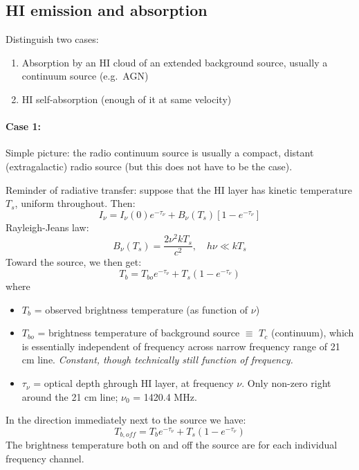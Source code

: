 \documentclass[11pt]{article}
\newcommand{\mar}[1]{\hspace{0pt}\marginpar{-\textcolor{black}{#1}-}}
\newcommand{\mynotes}[1]{{\fontfamily{cmss}\selectfont \textit{#1}}}
\begin{document}
\subsection{HI emission and absorption}
\mar{41}Distinguish two cases:
\begin{enumerate}
    \item Absorption by an HI cloud of an extended background source, usually
        a continuum source (e.g.\ AGN)
    \item HI self-absorption (enough of it at same velocity)
\end{enumerate}
\paragraph{Case 1:}
Simple picture: the radio continuum source is usually a compact, distant
(extragalactic) radio source (but this does not have to be the case).

Reminder of radiative transfer: suppose that the HI layer has kinetic
temperature $T_{s}$, uniform throughout. Then:
\[
    I_{\nu} = I_{\nu}(0)e^{-\tau_{\nu}}
    + B_{\nu} (T_{s}) \left[ 1 - e^{-\tau_{\nu}} \right]
    \]
Rayleigh-Jeans law:
\[
    B_{\nu} (T_{s}) = \frac{2\nu^{2}kT_{s}}{c^{2}}, \quad h\nu \ll kT_{s}
    \]
Toward the source, we then get:
\[
    T_{b} = T_{bo} e^{-\tau_{\nu}} + T_{s} \left( 1 - e^{-\tau_{\nu}} \right)
    \]
where
\begin{itemize}
    \item $T_{b}$ = observed brightness temperature (as function of $\nu$)
    \item $T_{bo}$ = brightness temperature of background source $\equiv$ $T_{c}$
        (continuum), which is essentially independent of frequency across narrow
        frequency range of 21 cm line. \mynotes{Constant, though technically still
        function of frequency.}
    \item $\tau_{\nu}$ = optical depth ghrough HI layer, at frequency $\nu$.
        Only non-zero right around the 21 cm line; $\nu_{0}$ = 1420.4 MHz.
\end{itemize}

\mar{42}In the direction immediately next to the source we have:
\[
    T_{b, off} = T_{b} e^{-\tau_{\nu}} + T_{s} \left( 1 - e^{-\tau_{\nu}} \right)
    \]
The brightness temperature both on and off the source are for each
individual frequency channel.
\end{document}
